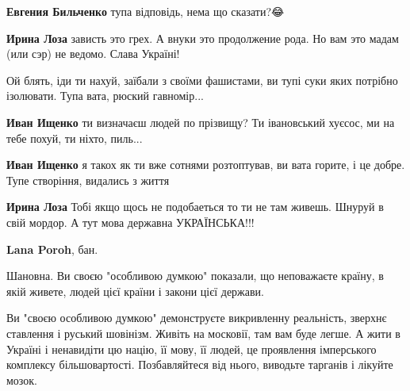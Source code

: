 \begin{itemize}
\begin{itemize}
\textbf{Евгения Бильченко} тупа відповідь, нема що сказати?😂


\textbf{Ирина Лоза} зависть это грех. А внуки это продолжение рода. Но вам это мадам (или сэр) не ведомо. Слава Україні!


Ой блять, іди ти нахуй, заїбали з своїми фашистами, ви тупі суки яких потрібно ізолювати. Тупа вата, рюский гавномір...


\textbf{Иван Ищенко} ти визначаєш людей по прізвищу? Ти івановський хуєсос, ми на тебе похуй, ти ніхто, пиль...


\textbf{Иван Ищенко} я такох як ти вже сотнями розтоптував, ви вата горите, і це добре. Тупе створіння, видались з життя


\textbf{Ирина Лоза} Тобі якщо щось не подобаеться то ти не там живешь. Шнуруй в свій мордор. А тут мова державна УКРАЇНСЬКА!!!


\textbf{Lana Poroh}, бан.

\end{itemize}



Шановна. Ви своєю "особливою думкою" показали, що неповажаєте країну, в якій
живете, людей цієї країни і закони цієї держави.

Ви "своєю особливою думкою" демонструєте викривленну реальність, зверхнє
ставлення і руський шовінізм. Живіть на московії, там вам буде легше. А жити в
Україні і ненавидіти цю націю, її мову, її людей, це проявлення імперського
комплексу більшовартості. Позбавляйтеся від нього, виводьте тарганів і лікуйте
мозок.



\end{itemize}
